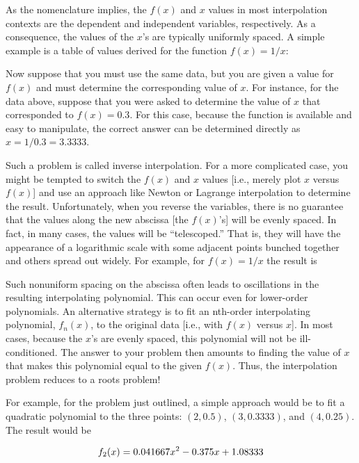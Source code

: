 \documentclass[../main.tex]{subfiles}
\begin{document}
\noindent As the nomenclature implies, the $f (x)$ and $x$ values in most interpolation contexts are the
dependent and independent variables, respectively. As a consequence, the values of the $x$'s
are typically uniformly spaced. A simple example is a table of values derived for the function
$f (x) = 1/x$:


Now suppose that you must use the same data, but you are given a value for $f (x)$ and
must determine the corresponding value of $x$. For instance, for the data above, suppose that
you were asked to determine the value of $x$ that corresponded to $f (x) = 0.3$. For this case,
because the function is available and easy to manipulate, the correct answer can be determined directly as $x = 1/0.3 = 3.3333$.

Such a problem is called inverse interpolation. For a more complicated case, you
might be tempted to switch the $f (x)$ and $x$ values [i.e., merely plot $x$ versus $f (x)$] and use
an approach like Newton or Lagrange interpolation to determine the result. Unfortunately,
when you reverse the variables, there is no guarantee that the values along the new abscissa
[the $f (x)$'s] will be evenly spaced. In fact, in many cases, the values will be ``telescoped.''
That is, they will have the appearance of a logarithmic scale with some adjacent points
bunched together and others spread out widely. For example, for $f (x) = 1/x$ the result is


Such nonuniform spacing on the abscissa often leads to oscillations in the resulting interpolating polynomial. This can occur even for lower-order polynomials. An alternative
strategy is to fit an nth-order interpolating polynomial, $f_n (x)$, to the original data [i.e., with
$f (x)$ versus $x$]. In most cases, because the $x$'s are evenly spaced, this polynomial will not
be ill-conditioned. The answer to your problem then amounts to finding the value of $x$ that
makes this polynomial equal to the given $f (x)$. Thus, the interpolation problem reduces to
a roots problem!

For example, for the problem just outlined, a simple approach would be to fit a quadratic polynomial to the three points: $(2, 0.5)$, $(3, 0.3333)$, and $(4, 0.25)$. The result would be

\begin{equation}
	\notag
	f_2 (x) =  0.041667x^2 - 0.375x + 1.08333
\end{equation}
\end{document}
